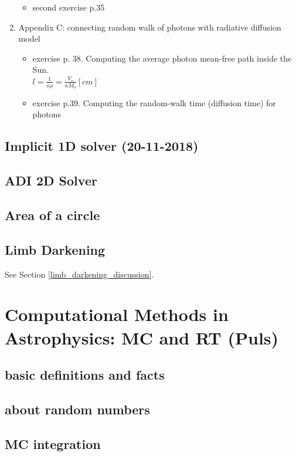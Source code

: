 \documentclass[../main/main.tex]{subfiles}
\begin{document}
\begin{enumerate}
\begin{itemize}
\begin{itemize}
\end{itemize}

\item second exercise p.35
\end{itemize}

\item Appendix C: connecting random walk of photons with radiative diffusion model
\begin{itemize}
\item exercise p. 38. Computing the average photon mean-free path inside the Sun. \\
$l = \frac{1}{\kappa \rho} = \frac{V_o}{\kappa M_o} [cm]$

\item exercise p.39. Computing the random-walk time (diffusion time) for photons

\end{itemize}


\end{enumerate}

\subsection{Implicit 1D solver (20-11-2018)}
\subsection{ADI 2D Solver}
\subsection{Area of a circle}
\subsection{Limb Darkening}
See Section \ref{limb_darkening_discussion}.

\newpage
\section{Computational Methods in Astrophysics: MC and RT (Puls)}
\subsection{basic definitions and facts}
\subsection{about random numbers}
\subsection{MC integration}
\end{document}
